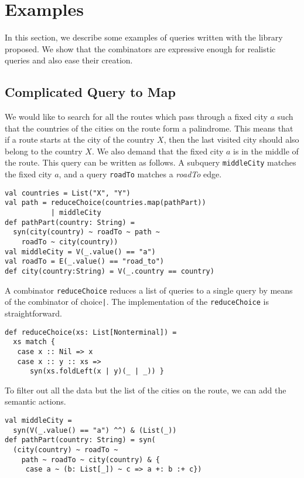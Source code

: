 \section{Examples}
\label{sec:examples}

In this section, we describe some examples of queries written with the library proposed.
We show that the combinators are expressive enough for realistic queries and also ease their creation.

\subsection{Complicated Query to Map}

We would like to search for all the routes which pass through a fixed city $a$ such that the countries of the cities on the route form a palindrome.
This means that if a route starts at the city of the country $X$, then the last visited city should also belong to the country $X$.
We also demand that the fixed city $a$ is in the middle of the route.
This query can be written as follows.
A subquery \lstinline{middleCity} matches the fixed city $a$, and a query \lstinline{roadTo} matches a \emph{roadTo} edge.

\begin{lstlisting}
val countries = List("X", "Y")
val path = reduceChoice(countries.map(pathPart))
           | middleCity
def pathPart(country: String) =
  syn(city(country) ~ roadTo ~ path ~
    roadTo ~ city(country))
val middleCity = V(_.value() == "a")
val roadTo = E(_.value() == "road_to")
def city(country:String) = V(_.country == country)
\end{lstlisting}

A combinator \lstinline{reduceChoice} reduces a list of queries to a single query by means of the combinator of choice\lstinline{|}.
The implementation of the \lstinline{reduceChoice} is straightforward.

\begin{lstlisting}
def reduceChoice(xs: List[Nonterminal]) =
  xs match {
   case x :: Nil => x
   case x :: y :: xs =>
      syn(xs.foldLeft(x | y)(_ | _)) }
\end{lstlisting}

To filter out all the data but the list of the cities on the route, we can add the semantic actions.

\begin{lstlisting}
val middleCity =
  syn(V(_.value() == "a") ^^) & (List(_))
def pathPart(country: String) = syn(
  (city(country) ~ roadTo ~
    path ~ roadTo ~ city(country) & {
     case a ~ (b: List[_]) ~ c => a +: b :+ c})
\end{lstlisting}

